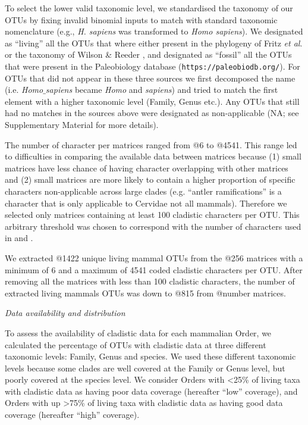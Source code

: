 \documentclass[12pt,letterpaper]{article}
\renewcommand{\subsection}[1]{%
\bigskip
\begin{center}
\begin{large}
\normalfont\itshape #1
\end{large}
\end{center}}
\begin{document}
To select the lower valid taxonomic level, we standardised the taxonomy of our OTUs by fixing invalid binomial inputs to match with standard taxonomic nomenclature (e.g., \textit{H. sapiens} was transformed to \textit{Homo sapiens}).
We designated as ``living'' all the OTUs that where either present in the phylogeny of Fritz \textit{et al}. \citep{FritzTree} or the taxonomy of Wilson \& Reeder \citep{wilson2005mammal}, and designated as ``fossil'' all the OTUs that were present in the Paleobiology database (\texttt{https://paleobiodb.org/}).
For OTUs that did not appear in these three sources we first decomposed the name (i.e. \textit{Homo$\_$sapiens} became \textit{Homo} and \textit{sapiens}) and tried to match the first element with a higher taxonomic level (Family, Genus etc.).
Any OTUs that still had no matches in the sources above were designated as non-applicable (NA; see Supplementary Material for more details).

The number of character per matrices ranged from @6 to @4541.
This range led to difficulties in comparing the available data between matrices because (1) small matrices have less chance of having character overlapping with other matrices \citep{wagner2000} and (2) small matrices are more likely to contain a higher proportion of specific characters non-applicable across large clades \citep{Brazeau2011} (e.g. ``antler ramifications'' is a character that is only applicable to Cervidae not all mammals).
Therefore we selected only matrices containing at least 100 cladistic characters per OTU.
This arbitrary threshold was chosen to correspond with the number of characters used in \citep{GuillermeCooper} and \citep{harrisonamong-character2014}.

We extracted @1422 unique living mammal OTUs from the @256 matrices with a minimum of 6 and a maximum of 4541 coded cladistic characters per OTU.
After removing all the matrices with less than 100 cladistic characters, the number of extracted living mammals OTUs was down to @815 from @number matrices.

\subsection{Data availability and distribution}
To assess the availability of cladistic data for each mammalian Order, we calculated the percentage of OTUs with cladistic data at three different taxonomic levels: Family, Genus and species.
We used these different taxonomic levels because some clades are well covered at the Family or Genus level, but poorly covered at the species level.
We consider Orders with \textless 25\% of living taxa with cladistic data as having poor data coverage (hereafter ``low'' coverage), and Orders with up \textgreater 75\% of living taxa with cladistic data as having good data coverage (hereafter ``high'' coverage). 
\end{document}
